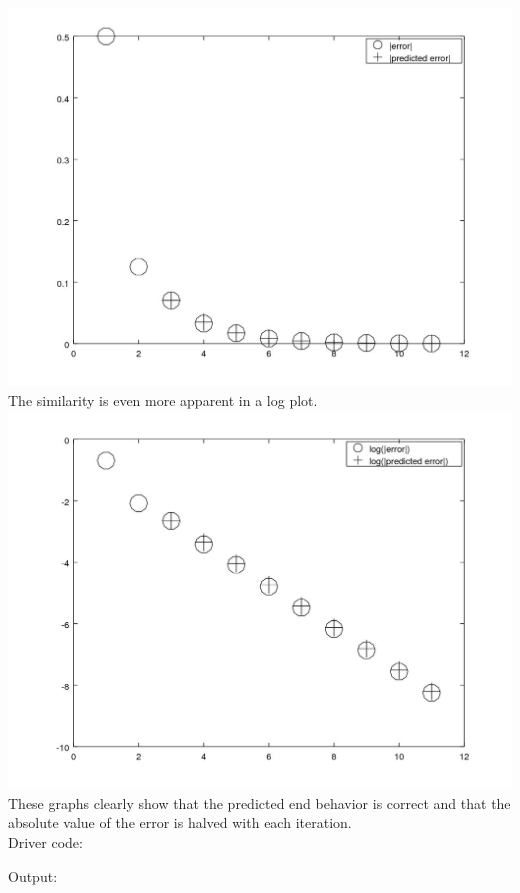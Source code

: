 \documentclass[12pt]{article}
\theoremstyle{homework}
\begin{document}
\includegraphics[scale=.5]{../octave/f1.jpg}\\
The similarity is even more apparent in a log plot.\\
\includegraphics[scale=.5]{../octave/f2.jpg}\\
These graphs clearly show that the predicted end behavior is correct and that the absolute value of the error is halved with each iteration.\\
\newpage
Driver code:

Output:

\end{document}
